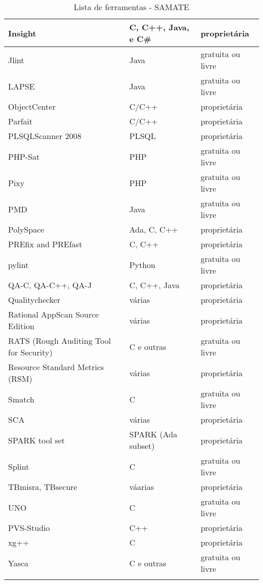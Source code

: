 \begin{center}
\begin{longtable}{ | l | l | l |}
Insight &   C, C++, Java, e C\#  & proprietária \\ \hline
Jlint &   Java  & gratuita ou livre \\ \hline
LAPSE &   Java  & gratuita ou livre \\ \hline
ObjectCenter &  C/C++  & proprietária \\ \hline
Parfait &   C/C++  & proprietária \\ \hline
PLSQLScanner 2008 &   PLSQL   & proprietária \\ \hline
PHP-Sat &   PHP   & gratuita ou livre \\ \hline
Pixy &  PHP   & gratuita ou livre \\ \hline
PMD &   Java  & gratuita ou livre \\ \hline
PolySpace &   Ada, C, C++   & proprietária \\ \hline
PREfix and PREfast &  C, C++  & proprietária \\ \hline
pylint &  Python  & gratuita ou livre \\ \hline
QA-C, QA-C++, QA-J &  C, C++, Java  & proprietária \\ \hline
Qualitychecker &  várias   & proprietária \\ \hline
Rational AppScan Source Edition &   várias  & proprietária \\ \hline
RATS (Rough Auditing Tool for Security) &   C e outras   & gratuita ou livre \\ \hline
Resource Standard Metrics (RSM) &   várias  & proprietária \\ \hline
Smatch &  C   & gratuita ou livre \\ \hline
SCA &   várias & proprietária \\ \hline
SPARK tool set &  SPARK (Ada subset)  & proprietária \\ \hline
Splint &  C   & gratuita ou livre \\ \hline
TBmisra, TBsecure &  váarias  & proprietária \\ \hline
UNO &   C   & gratuita ou livre \\ \hline
PVS-Studio &  C++   & proprietária \\ \hline
xg++ &  C   & proprietária \\ \hline
Yasca &   C e outras & gratuita ou livre \\
        \hline
        
        \caption{Lista de ferramentas - SAMATE}
        \label{tabela_ferramentas}
        \end{longtable}

        \end{center}
